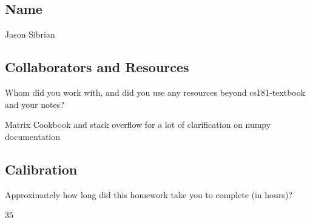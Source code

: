 \documentclass[submit]{harvardml}
\begin{document}
\subsection*{Name}
Jason Sibrian
\subsection*{Collaborators and Resources}
Whom did you work with, and did you use any resources beyond cs181-textbook and your notes?

Matrix Cookbook and stack overflow for a lot of clarification on numpy documentation

\subsection*{Calibration}
Approximately how long did this homework take you to complete (in hours)? 

35
\end{document}
